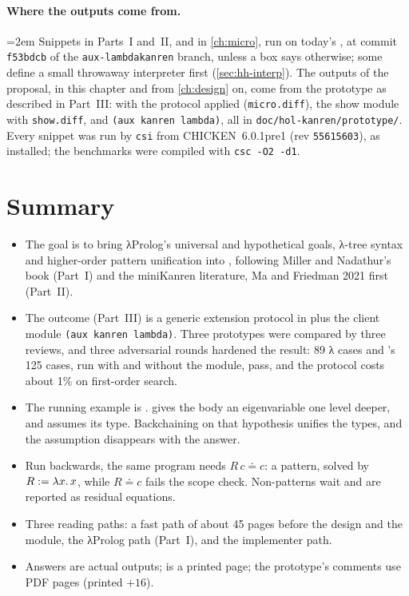 \paragraph{Where the outputs come from.} {\emergencystretch=2em Snippets in Parts~I and~II, and in \cref{ch:micro}, run on today's
\micro, at commit \texttt{f53bdcb} of the \texttt{aux-\allowbreak lambdakanren} branch, unless a box says otherwise; some
define a small throwaway interpreter first (\cref{sec:hh-interp}). The outputs of the proposal, in this
chapter and from \cref{ch:design} on, come from the prototype as described in Part~III: \micro{} with the
protocol applied (\texttt{micro.diff}), the show module with \texttt{show.diff}, and
\texttt{(aux kanren lambda)}, all in \texttt{doc/\allowbreak hol-kanren/\allowbreak prototype/}. Every snippet was run by
\texttt{csi} from CHICKEN~6.0.1pre1 (rev \texttt{55615603}), as installed; the
benchmarks were compiled with \mbox{\texttt{csc -O2 -d1}}.\par}

\section{Summary}\label{sec:intro-summary}
\begin{itemize}
  \item The goal is to bring λProlog's universal and hypothetical goals, λ-tree syntax and higher-order pattern
        unification into \micro, following Miller and Nadathur's book (Part~I) and the miniKanren literature,
        Ma and Friedman 2021 first (Part~II).
  \item The outcome (Part~III) is a generic extension protocol in \micro{} plus the client module
        \texttt{(aux kanren lambda)}. Three prototypes were compared by three reviews, and three adversarial
        rounds hardened the result: 89 λ cases and \micro's 125 cases, run with and without the module,
        pass, and the protocol costs about 1\% on first-order search.
  \item The running example is .  gives the body an eigenvariable one level deeper, and
         assumes its type. Backchaining on that hypothesis unifies the types, and the assumption
        disappears with the answer.
  \item Run backwards, the same program needs $R\,c\doteq c$: a pattern, solved by $R:=\lambda x.\,x$, while
        $R\doteq c$ fails the scope check. Non-patterns wait and are reported as residual equations.
  \item Three reading paths: a fast path of about 45 pages before the design and the module, the λProlog
        path (Part~I), and the implementer path.
  \item Answers are actual outputs;  is a printed page; the prototype's comments use PDF pages
        (printed $+16$).
\end{itemize}
